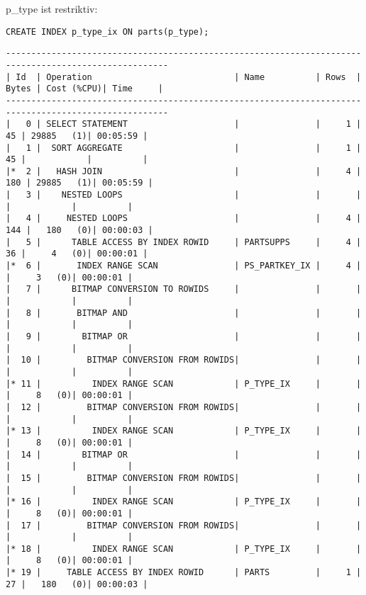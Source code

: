 \documentclass[10pt]{article}
\begin{document}
p\_type ist restriktiv:
\begin{lstlisting}[style=sql]
CREATE INDEX p_type_ix ON parts(p_type);
\end{lstlisting}
\begin{lstlisting}[style=queryexecutionplan]
------------------------------------------------------------------------------------------------------
| Id  | Operation                            | Name          | Rows  | Bytes | Cost (%CPU)| Time     |
------------------------------------------------------------------------------------------------------
|   0 | SELECT STATEMENT                     |               |     1 |    45 | 29885   (1)| 00:05:59 |
|   1 |  SORT AGGREGATE                      |               |     1 |    45 |            |          |
|*  2 |   HASH JOIN                          |               |     4 |   180 | 29885   (1)| 00:05:59 |
|   3 |    NESTED LOOPS                      |               |       |       |            |          |
|   4 |     NESTED LOOPS                     |               |     4 |   144 |   180   (0)| 00:00:03 |
|   5 |      TABLE ACCESS BY INDEX ROWID     | PARTSUPPS     |     4 |    36 |     4   (0)| 00:00:01 |
|*  6 |       INDEX RANGE SCAN               | PS_PARTKEY_IX |     4 |       |     3   (0)| 00:00:01 |
|   7 |      BITMAP CONVERSION TO ROWIDS     |               |       |       |            |          |
|   8 |       BITMAP AND                     |               |       |       |            |          |
|   9 |        BITMAP OR                     |               |       |       |            |          |
|  10 |         BITMAP CONVERSION FROM ROWIDS|               |       |       |            |          |
|* 11 |          INDEX RANGE SCAN            | P_TYPE_IX     |       |       |     8   (0)| 00:00:01 |
|  12 |         BITMAP CONVERSION FROM ROWIDS|               |       |       |            |          |
|* 13 |          INDEX RANGE SCAN            | P_TYPE_IX     |       |       |     8   (0)| 00:00:01 |
|  14 |        BITMAP OR                     |               |       |       |            |          |
|  15 |         BITMAP CONVERSION FROM ROWIDS|               |       |       |            |          |
|* 16 |          INDEX RANGE SCAN            | P_TYPE_IX     |       |       |     8   (0)| 00:00:01 |
|  17 |         BITMAP CONVERSION FROM ROWIDS|               |       |       |            |          |
|* 18 |          INDEX RANGE SCAN            | P_TYPE_IX     |       |       |     8   (0)| 00:00:01 |
|* 19 |     TABLE ACCESS BY INDEX ROWID      | PARTS         |     1 |    27 |   180   (0)| 00:00:03 |

\end{lstlisting}
\end{document}
